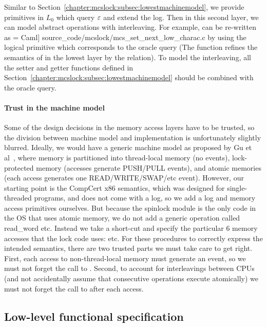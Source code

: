 Similar to Section~\ref{chapter:mcslock:subsec:lowestmachinemodel}, we provide primitives in $L_0$ which query ${\varepsilon}$ and extend the log.
Then in this second layer, we can model abstract operations with interleaving.
For example,  can be re-written as
 = Caml] {source_code/mcslock/mcs_set_next_low_charac.c}
by using the logical primitive which corresponds to the oracle query
(The function  refines the semantics of  in the lowest layer by the  relation).
To model the interleaving, all the setter and getter functions defined
in Section~\ref{chapter:mcslock:subsec:lowestmachinemodel} should be combined with the
oracle query.

\paragraph{Trust in the machine model}
Some of the design decisions in the memory access
layers have to be trusted, so the division between machine model and
implementation is unfortunately slightly blurred.
Ideally, we would have a generic machine model as proposed by Gu et
al~\cite{certikos:osdi16}, where memory is partitioned into thread-local
memory (no events), lock-protected memory (accesses generate PUSH/PULL
events), and atomic memories (each access
generates one READ/WRITE/SWAP/etc event).  However, our starting point
is the CompCert x86 semantics, which was designed for single-threaded
programs, and does not come with a log, so we add a log and memory access
primitives ourselves.
But because the spinlock module is the only code in the OS that uses
atomic memory, we do not add a generic operation called
read\_word etc. Instead we take a short-cut and specify the particular
6 memory accesses that the lock code uses:  etc.
For these procedures to correctly express the intended semantics,
there are two trusted parts we must take care to get right. First,
each access to non-thread-local memory must generate an event, so we
must not forget the call to
. 
Second, to account for
interleavings between CPUs (and not accidentally assume that consecutive
operations execute atomically) we must not forget the call to
 after each access.


\subsection{Low-level functional specification}
\label{chapter:mcslock:subsec:atomicoperation}


